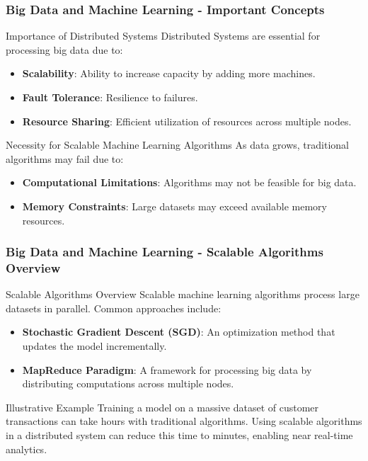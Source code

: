 \documentclass[aspectratio=169]{beamer}
\begin{document}
\begin{frame}[fragile]
    \frametitle{Big Data and Machine Learning - Important Concepts}
    \begin{block}{Importance of Distributed Systems}
        Distributed Systems are essential for processing big data due to:
        \begin{itemize}
            \item \textbf{Scalability}: Ability to increase capacity by adding more machines.
            \item \textbf{Fault Tolerance}: Resilience to failures.
            \item \textbf{Resource Sharing}: Efficient utilization of resources across multiple nodes.
        \end{itemize}
    \end{block}
    
    \begin{block}{Necessity for Scalable Machine Learning Algorithms}
        As data grows, traditional algorithms may fail due to:
        \begin{itemize}
            \item \textbf{Computational Limitations}: Algorithms may not be feasible for big data.
            \item \textbf{Memory Constraints}: Large datasets may exceed available memory resources.
        \end{itemize}
    \end{block}
\end{frame}

\begin{frame}[fragile]
    \frametitle{Big Data and Machine Learning - Scalable Algorithms Overview}
    \begin{block}{Scalable Algorithms Overview}
        Scalable machine learning algorithms process large datasets in parallel. Common approaches include:
        \begin{itemize}
            \item \textbf{Stochastic Gradient Descent (SGD)}: An optimization method that updates the model incrementally.
            \item \textbf{MapReduce Paradigm}: A framework for processing big data by distributing computations across multiple nodes.
        \end{itemize}
    \end{block}
    
    \begin{block}{Illustrative Example}
        Training a model on a massive dataset of customer transactions can take hours with traditional algorithms. Using scalable algorithms in a distributed system can reduce this time to minutes, enabling near real-time analytics.
    \end{block}
\end{frame}
\end{document}
